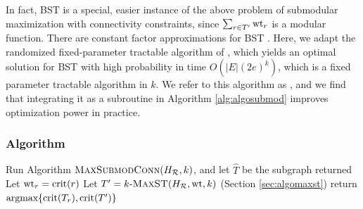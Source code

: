 In fact, \textsc{BST} is a special, easier instance of the above problem of submodular maximization with connectivity constraints, since $\sum_{r\in T'} \text{wt}_r$ is a modular function.
There are constant factor approximations for BST \cite{ravi1996spanning}. Here, we adapt the randomized fixed-parameter tractable algorithm of \cite{cadena:sdm17}, which yields an optimal solution for \textsc{BST} with high probability in time $O(|E|(2e)^k)$, which is a fixed parameter tractable algorithm in $k$. We refer to this algorithm as \algomaxst{}, and we find that integrating it as a subroutine in Algorithm \ref{alg:algosubmod} improves optimization power in practice.

\subsubsection{Algorithm \algomaxcrit{}}
\begin{algorithm}{}
\small
\caption{\small $\algomaxcrit(H_{\R}, k)$}
\label{alg:algomaxcrit}
\begin{algorithmic}[1]
\STATE Run Algorithm $\textsc{MaxSubmodConn}(H_{\mathcal{R}}, k)$, and let $\hat{T}$ be the subgraph returned
  \STATE Let $\text{wt}_r = \text{crit}(r)$
\ENDFOR
\STATE Let $T'=\text{$k$-\textsc{MaxST}}(H_{\mathcal{R}}, \text{wt}, k)$ (Section \ref{sec:algomaxst})
\STATE return $\mbox{argmax}\{\text{crit}(T_r), \text{crit}(T')\}$
\end{algorithmic}
\end{algorithm}



